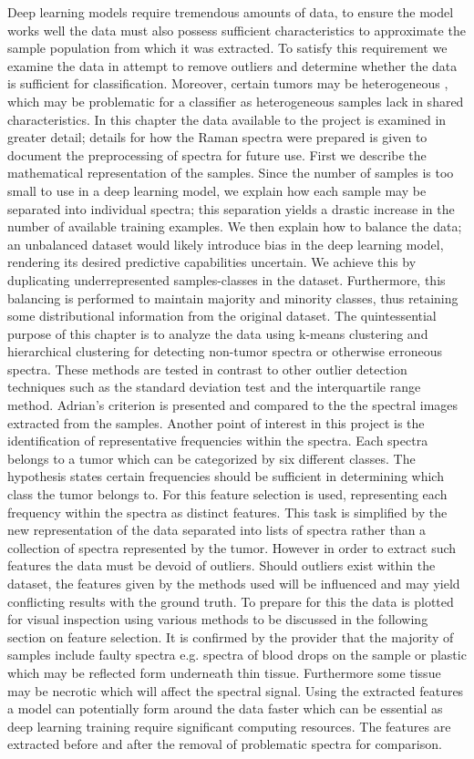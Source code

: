 Deep learning models require tremendous amounts of data, to ensure the model works well the data must also possess sufficient characteristics to approximate the sample population from which it was extracted. To satisfy this requirement we examine the data in attempt to remove outliers and determine whether the data is sufficient for classification. Moreover, certain tumors may be heterogeneous \cite{friedmann2014glioblastoma}, which may be problematic for a classifier as heterogeneous samples lack in shared characteristics. In this chapter the data available to the project is examined in greater detail; details for how the Raman spectra were prepared is given to document the preprocessing of spectra for future use. First we describe the mathematical representation of the samples. Since the number of samples is too small to use in a deep learning model, we explain how each sample may be separated into individual spectra; this separation yields a drastic increase in the number of available training examples. We then explain how to balance the data; an unbalanced dataset would likely introduce bias in the deep learning model, rendering its desired predictive capabilities uncertain. We achieve this by duplicating underrepresented samples-classes in the dataset. Furthermore, this balancing is performed to maintain majority and minority classes, thus retaining some distributional information from the original dataset. The quintessential purpose of this chapter is to analyze the data using k-means clustering and hierarchical clustering for detecting non-tumor spectra or otherwise erroneous spectra. These methods are tested in contrast to other outlier detection techniques such as the standard deviation test and the interquartile range method. Adrian's criterion is presented and compared to the the spectral images extracted from the samples.
Another point of interest in this project is the identification of representative frequencies within the spectra. Each spectra belongs to a tumor which can be categorized by six different classes. The hypothesis states certain frequencies should be sufficient in determining which class the tumor belongs to. For this feature selection is used, representing each frequency within the spectra as distinct features. This task is simplified by the new representation of the data separated into lists of spectra rather than a collection of spectra represented by the tumor. However in order to extract such features the data must be devoid of outliers. Should outliers exist within the dataset, the features given by the methods used will be influenced and may yield conflicting results with the ground truth. To prepare for this the data is plotted for visual inspection using various methods to be discussed in the following section on feature selection. It is confirmed by the provider that the majority of samples include faulty spectra e.g. spectra of blood drops on the sample or plastic which may be reflected form underneath thin tissue. Furthermore some tissue may be necrotic which will affect the spectral signal. Using the extracted features a model can potentially form around the data faster which can be essential as deep learning training require significant computing resources. The features are extracted before and after the removal of problematic spectra for comparison.


